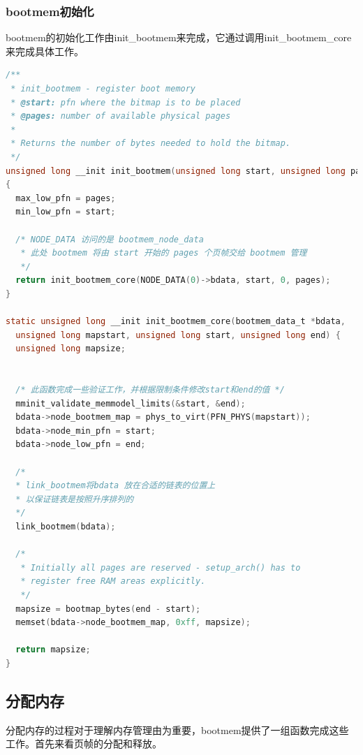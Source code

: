 \documentclass[b5paper,9pt,twoside,openany]{article}
\begin{document}
\subsubsection{bootmem初始化}
bootmem的初始化工作由init\_bootmem来完成，它通过调用init\_bootmem\_core来完成具体工作。
\begin{lstlisting}[language=C]
/**
 * init_bootmem - register boot memory
 * @start: pfn where the bitmap is to be placed
 * @pages: number of available physical pages
 *
 * Returns the number of bytes needed to hold the bitmap.
 */
unsigned long __init init_bootmem(unsigned long start, unsigned long pages)
{
  max_low_pfn = pages;
  min_low_pfn = start;

  /* NODE_DATA 访问的是 bootmem_node_data
   * 此处 bootmem 将由 start 开始的 pages 个页帧交给 bootmem 管理
   */
  return init_bootmem_core(NODE_DATA(0)->bdata, start, 0, pages);
}

static unsigned long __init init_bootmem_core(bootmem_data_t *bdata,
  unsigned long mapstart, unsigned long start, unsigned long end) {
  unsigned long mapsize;


  /* 此函数完成一些验证工作，并根据限制条件修改start和end的值 */
  mminit_validate_memmodel_limits(&start, &end);
  bdata->node_bootmem_map = phys_to_virt(PFN_PHYS(mapstart));
  bdata->node_min_pfn = start;
  bdata->node_low_pfn = end;

  /*
  * link_bootmem将bdata 放在合适的链表的位置上
  * 以保证链表是按照升序排列的
  */
  link_bootmem(bdata);

  /*
   * Initially all pages are reserved - setup_arch() has to
   * register free RAM areas explicitly.
   */
  mapsize = bootmap_bytes(end - start);
  memset(bdata->node_bootmem_map, 0xff, mapsize);

  return mapsize;
}

\end{lstlisting}

\subsection{分配内存}
分配内存的过程对于理解内存管理由为重要，bootmem提供了一组函数完成这些工作。首先来看页帧的分配和释放。
\end{document}
